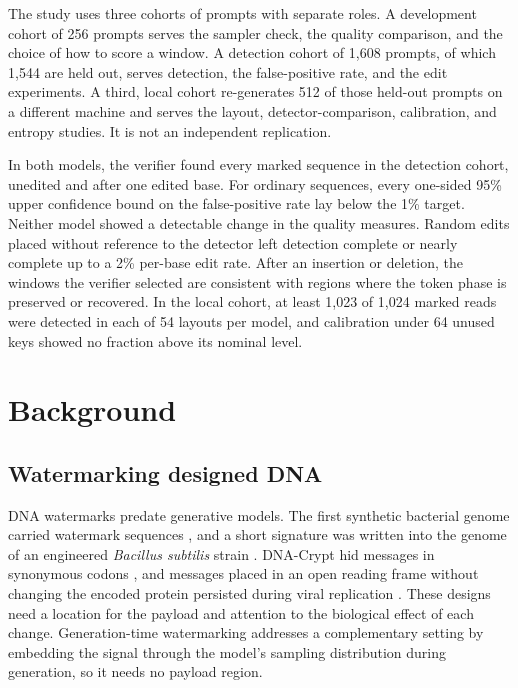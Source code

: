 \documentclass[10pt,twocolumn]{article}
\begin{document}
The study uses three cohorts of prompts with separate roles. A development cohort of 256 prompts
serves the sampler check, the quality comparison, and the choice of how to score a window. A
detection cohort of 1{,}608 prompts, of which 1{,}544 are held out, serves detection, the
false-positive rate, and the edit experiments. A third, local cohort re-generates 512 of those
held-out prompts on a different machine and serves the layout, detector-comparison, calibration,
and entropy studies. It is not an independent replication.

In both models, the verifier found every marked sequence in the detection cohort, unedited and after
one edited base. For ordinary sequences, every one-sided 95\% upper confidence bound on the
false-positive rate lay below the 1\% target. Neither model showed a detectable change in the
quality measures. Random edits placed without reference to the detector left detection complete or
nearly complete up to a 2\% per-base edit rate. After an insertion or deletion, the windows the
verifier selected are consistent with regions where the token phase is preserved or recovered.
In the local cohort, at least 1{,}023 of 1{,}024 marked reads were detected in each of 54 layouts
per model, and calibration under 64 unused keys showed no fraction above its nominal level.

\section{Background}
\label{sec:background}

\subsection{Watermarking designed DNA}

DNA watermarks predate generative models. The first synthetic bacterial genome carried watermark
sequences \cite{gibson2010creation}, and a short signature was written into the genome of an
engineered \textit{Bacillus subtilis} strain \cite{arita2004secret}. DNA-Crypt hid messages in
synonymous codons \cite{heider2007dna}, and messages placed in an open reading frame without
changing the encoded protein persisted during viral replication \cite{liss2012watermarks}. These
designs need a location for the payload and attention to the biological effect of each change. Generation-time
watermarking addresses a complementary setting by embedding the signal through the model's
sampling distribution during generation, so it needs no payload region.
\end{document}
